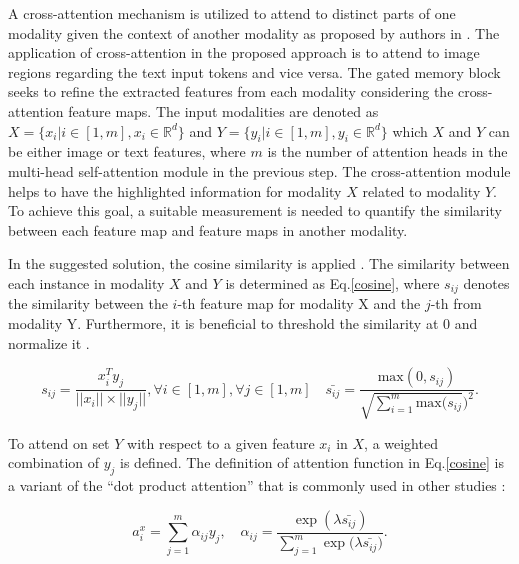 \documentclass{midl}
\begin{document}
A cross-attention mechanism is utilized to attend to distinct parts of one modality given the context of another modality as proposed by authors in \cite{chen2020imram, wei2020multi}. The application of cross-attention in the proposed approach is to attend to image regions regarding the text input tokens and vice versa. The gated memory block seeks to refine the extracted features from each modality considering the cross-attention feature maps. The input modalities are denoted as $X = \{x_i | i \in [1,m], x_i \in \mathbb{R}^d\}$ and $Y = \{y_i | i \in [1,m], y_i \in \mathbb{R}^d\}$ which $X$ and $Y$ can be either image or text features, where $m$ is the number of attention heads in the multi-head self-attention module in the previous step. The cross-attention module helps to have the highlighted information for modality $X$ related to modality $Y$. To achieve this goal, a suitable measurement is needed to quantify the similarity between each feature map and feature maps in another modality.

In the suggested solution, the cosine similarity is applied \cite{ji2019saliency, jia2021scaling,lee2018stacked}. The similarity between each instance in modality $X$ and $Y$ is determined as Eq.\ref{cosine}, where $s_{ij}$ denotes the similarity between the $i$-th feature map for modality X and the $j$-th from modality Y. 
Furthermore, it is beneficial to threshold the similarity at 0 and normalize it \cite{karpathy2014deep,lee2018stacked}.

\begin{equation}\label{cosine}
    s_{ij} = \frac{x_i^Ty_j}{||x_i|| \times  ||y_j||}, \forall i \in [1,m], \forall j \in [1,m] \quad     \bar{s_{ij}} = \frac{\textrm{max}(0, s_{ij})}{\sqrt{\sum_{i=1}^{m}\textrm{max}(s_{ij}})^2}.
\end{equation}





To attend on set $Y$ with respect to a given feature $x_i$ in $X$, a weighted combination of $y_j$ is defined. The definition of attention function in Eq.\ref{cosine} is a variant of the ``dot product attention'' that is commonly used in other studies  \cite{luong2015effective}:

\begin{equation}\label{attn}
   a_i^x  = \sum_{j=1}^{m} \alpha_{ij}y_j, \quad \alpha_{ij} = \frac{\exp(\lambda \bar{s_{ij}})}{{\sum_{j=1}^{m}\exp(\lambda \bar{s_{ij}}})}.
\end{equation}
\end{document}

